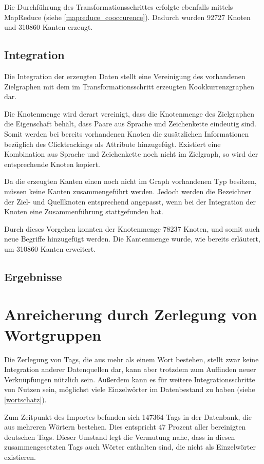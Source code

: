 Die Durchführung des Transformationsschrittes erfolgte ebenfalls mittels MapReduce (siehe \cref{mapreduce_cooccurence}). Dadurch wurden \num{92727} Knoten und \num{310860} Kanten erzeugt.

\subsection{Integration}
\label{click_integration}

Die Integration der erzeugten Daten stellt eine Vereinigung des vorhandenen Zielgraphen mit dem im Transformationsschritt erzeugten Kookkurrenzgraphen dar.

Die Knotenmenge wird derart vereinigt, dass die Knotenmenge des Zielgraphen die Eigenschaft behält, dass Paare aus Sprache und Zeichenkette eindeutig sind. Somit werden bei bereits vorhandenen Knoten die zusätzlichen Informationen bezüglich des Clicktrackings als Attribute hinzugefügt. Existiert eine Kombination aus Sprache und Zeichenkette noch nicht im Zielgraph, so wird der entsprechende Knoten kopiert.

Da die erzeugten Kanten einen noch nicht im Graph vorhandenen Typ besitzen, müssen keine Kanten zusammengeführt werden. Jedoch werden die Bezeichner der Ziel- und Quellknoten entsprechend angepasst, wenn bei der Integration der Knoten eine Zusammenführung stattgefunden hat.

Durch dieses Vorgehen konnten der Knotenmenge \num{78237} Knoten, und somit auch neue Begriffe hinzugefügt werden. Die Kantenmenge wurde, wie bereits erläutert, um \num{310860} Kanten erweitert.

\subsection{Ergebnisse}

\section{Anreicherung durch Zerlegung von Wortgruppen}
\label{decomposition}

Die Zerlegung von Tags, die aus mehr als einem Wort bestehen, stellt zwar keine Integration anderer Datenquellen dar, kann aber trotzdem zum Auffinden neuer Verknüpfungen nützlich sein. Außerdem kann es für weitere Integrationsschritte von Nutzen sein, möglichst viele Einzelwörter im Datenbestand zu haben (siehe \cref{wortschatz}).

Zum Zeitpunkt des Importes befanden sich \num{147364} Tags in der Datenbank, die aus mehreren Wörtern bestehen. Dies entspricht \num{47} Prozent aller bereinigten deutschen Tags. Dieser Umstand legt die Vermutung nahe, dass in diesen zusammengesetzten Tags auch Wörter enthalten sind, die nicht als Einzelwörter existieren.

